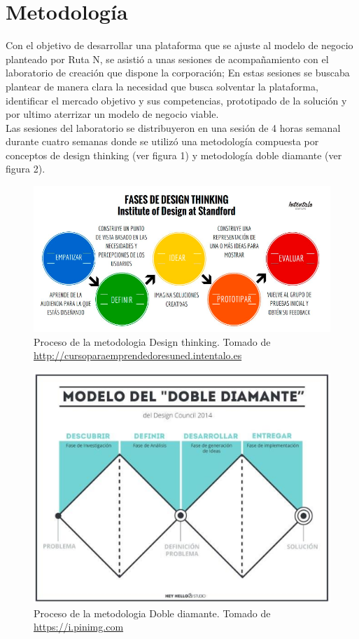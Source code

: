 \chapter*{Metodología}
Con el objetivo de desarrollar una plataforma que se ajuste al modelo de negocio  planteado por Ruta N, se asistió a unas sesiones de acompañamiento con el  laboratorio de creación que dispone la corporación; En estas sesiones se buscaba  plantear de manera clara la necesidad que busca solventar la plataforma, identificar el mercado objetivo y sus competencias, prototipado de la solución y por ultimo  aterrizar un modelo de negocio viable. \\

Las sesiones del laboratorio se distribuyeron en una sesión de 4 horas
semanal  durante cuatro semanas donde se utilizó una  metodología compuesta por conceptos  de design thinking (ver figura 1) y  metodología doble diamante (ver figura 2).


\begin{figure}[ht]
  \includegraphics[width=\linewidth, center]{images/design_thinking.PNG}
  \caption{Proceso de la metodologia Design thinking. Tomado de \url{http://cursoparaemprendedoresuned.intentalo.es}}
  \label{fig:img1}
\end{figure}

\begin{figure}[ht]
  \includegraphics[scale=0.8, center]{images/doble_diamante.PNG}
  \caption{Proceso de la metodologia Doble diamante. Tomado de \url{https://i.pinimg.com}}
  \label{fig:img2}
\end{figure}


